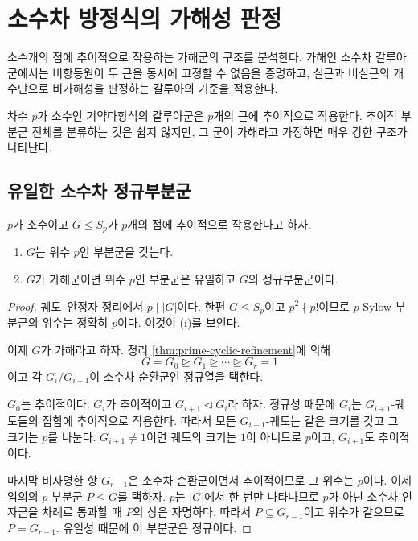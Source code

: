 \clearpage
\section{소수차 방정식의 가해성 판정}
\label{sec:prime-degree-solvability}

\begin{learninggoal}
소수개의 점에 추이적으로 작용하는 가해군의 구조를 분석한다. 가해인 소수차 갈루아군에서는 비항등원이 두 근을 동시에 고정할 수 없음을 증명하고, 실근과 비실근의 개수만으로 비가해성을 판정하는 갈루아의 기준을 적용한다.
\end{learninggoal}

차수 $p$가 소수인 기약다항식의 갈루아군은 $p$개의 근에 추이적으로 작용한다. 추이적 부분군 전체를 분류하는 것은 쉽지 않지만, 그 군이 가해라고 가정하면 매우 강한 구조가 나타난다.

\subsection{유일한 소수차 정규부분군}

\begin{lemma}
\label{lem:solvable-transitive-prime-sylow}
$p$가 소수이고 $G\le S_p$가 $p$개의 점에 추이적으로 작용한다고 하자.
\begin{enumerate}[label=(\roman*)]
  \item $G$는 위수 $p$인 부분군을 갖는다.
  \item $G$가 가해군이면 위수 $p$인 부분군은 유일하고 $G$의 정규부분군이다.
\end{enumerate}
\end{lemma}

\begin{proof}
궤도--안정자 정리에서 $p\mid |G|$이다. 한편 $G\le S_p$이고 $p^2\nmid p!$이므로 $p$-Sylow 부분군의 위수는 정확히 $p$이다. 이것이 (i)를 보인다.

이제 $G$가 가해라고 하자. 정리 \ref{thm:prime-cyclic-refinement}에 의해
\[
  G=G_0\trianglerighteq G_1\trianglerighteq\cdots
  \trianglerighteq G_r=1
\]
이고 각 $G_i/G_{i+1}$이 소수차 순환군인 정규열을 택한다.

$G_0$는 추이적이다. $G_i$가 추이적이고 $G_{i+1}\triangleleft G_i$라 하자. 정규성 때문에 $G_i$는 $G_{i+1}$-궤도들의 집합에 추이적으로 작용한다. 따라서 모든 $G_{i+1}$-궤도는 같은 크기를 갖고 그 크기는 $p$를 나눈다. $G_{i+1}\ne1$이면 궤도의 크기는 $1$이 아니므로 $p$이고, $G_{i+1}$도 추이적이다.

마지막 비자명한 항 $G_{r-1}$은 소수차 순환군이면서 추이적이므로 그 위수는 $p$이다. 이제 임의의 $p$-부분군 $P\le G$를 택하자. $p$는 $|G|$에서 한 번만 나타나므로 $p$가 아닌 소수차 인자군을 차례로 통과할 때 $P$의 상은 자명하다. 따라서 $P\subseteq G_{r-1}$이고 위수가 같으므로 $P=G_{r-1}$. 유일성 때문에 이 부분군은 정규이다.
\end{proof}

